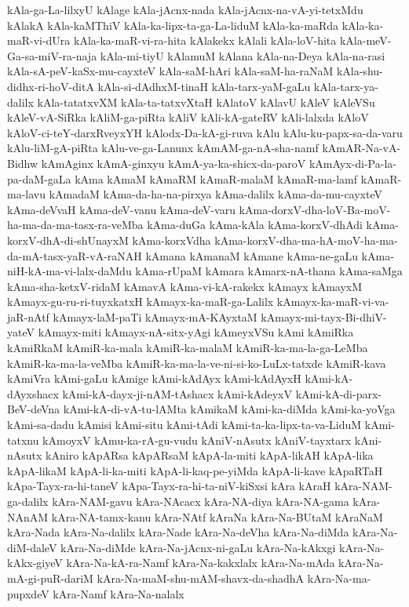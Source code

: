{kAla-ga-La-lilxyU
kAlage
kAla-jAcnx-nada
kAla-jAcnx-na-vA-yi-tetxMdu
kAlakA
kAla-kaMThiV
kAla-ka-lipx-ta-ga-La-liduM
kAla-ka-maRda
kAla-ka-maR-vi-dUra
kAla-ka-maR-vi-ra-hita
kAlakekx
kAlali
kAla-loV-hita
kAla-meV-Ga-sa-miV-ra-naja
kAla-mi-tiyU
kAlamuM
kAlana
kAla-na-Deya
kAla-na-rasi
kAla-sA-peV-kaSx-mu-cayxteV
kAla-saM-hAri
kAla-saM-ha-raNaM
kAla-shu-didhx-ri-hoV-ditA
kAla-si-dAdhxM-tinaH
kAla-tarx-yaM-gaLu
kAla-tarx-ya-dalilx
kAla-tatatxvXM
kAla-ta-tatxvXtaH
kAlatoV
kAlavU
kAleV
kAleVSu
kAleV-vA-SiRka
kAliM-ga-piRta
kAliV
kAli-kA-gateRV
kAli-lalxda
kAloV
kAloV-ci-teY-darxRveyxYH
kAlodx-Da-kA-gi-ruva
kAlu
kAlu-ku-papx-sa-da-varu
kAlu-liM-gA-piRta
kAlu-ve-ga-Lanunx
kAmAM-ga-nA-sha-namf
kAmAR-Na-vA-Bidhw
kAmAginx
kAmA-ginxyu
kAmA-ya-ka-shicx-da-paroV
kAmAyx-di-Pa-la-pa-daM-gaLa
kAma
kAmaM
kAmaRM
kAmaR-malaM
kAmaR-ma-lamf
kAmaR-ma-lavu
kAmadaM
kAma-da-ha-na-pirxya
kAma-dalilx
kAma-da-mu-cayxteV
kAma-deVvaH
kAma-deV-vanu
kAma-deV-varu
kAma-dorxV-dha-loV-Ba-moV-ha-ma-da-ma-tasx-ra-veMba
kAma-duGa
kAma-kAla
kAma-korxV-dhAdi
kAma-korxV-dhA-di-shUnayxM
kAma-korxVdha
kAma-korxV-dha-ma-hA-moV-ha-ma-da-mA-tasx-yaR-vA-raNAH
kAmana
kAmanaM
kAmane
kAma-ne-gaLu
kAma-niH-kA-ma-vi-lalx-daMdu
kAma-rUpaM
kAmara
kAmarx-nA-thana
kAma-saMga
kAma-sha-ketxV-ridaM
kAmavA
kAma-vi-kA-rakekx
kAmayx
kAmayxM
kAmayx-gu-ru-ri-tuyxkatxH
kAmayx-ka-maR-ga-Lalilx
kAmayx-ka-maR-vi-va-jaR-nAtf
kAmayx-laM-paTi
kAmayx-mA-KAyxtaM
kAmayx-mi-tayx-Bi-dhiV-yateV
kAmayx-miti
kAmayx-nA-sitx-yAgi
kAmeyxVSu
kAmi
kAmiRka
kAmiRkaM
kAmiR-ka-mala
kAmiR-ka-malaM
kAmiR-ka-ma-la-ga-LeMba
kAmiR-ka-ma-la-veMba
kAmiR-ka-ma-la-ve-ni-si-ko-LuLx-tatxde
kAmiR-kava
kAmiVra
kAmi-gaLu
kAmige
kAmi-kAdAyx
kAmi-kAdAyxH
kAmi-kA-dAyxshacx
kAmi-kA-dayx-ji-nAM-tAshacx
kAmi-kAdeyxV
kAmi-kA-di-parx-BeV-deVna
kAmi-kA-di-vA-tu-lAMta
kAmikaM
kAmi-ka-diMda
kAmi-ka-yoVga
kAmi-sa-dadu
kAmisi
kAmi-situ
kAmi-tAdi
kAmi-ta-ka-lipx-ta-va-LiduM
kAmi-tatxnu
kAmoyxV
kAmu-ka-rA-gu-vudu
kAniV-nAsutx
kAniV-tayxtarx
kAni-nAsutx
kAniro
kApARsa
kApARsaM
kApA-la-miti
kApA-likAH
kApA-lika
kApA-likaM
kApA-li-ka-miti
kApA-li-kaq-pe-yiMda
kApA-li-kave
kApaRTaH
kApa-Tayx-ra-hi-taneV
kApa-Tayx-ra-hi-ta-niV-kiSxsi
kAra
kAraH
kAra-NAM-ga-dalilx
kAra-NAM-gavu
kAra-NAcacx
kAra-NA-diya
kAra-NA-gama
kAra-NAnAM
kAra-NA-tamx-kanu
kAra-NAtf
kAraNa
kAra-Na-BUtaM
kAraNaM
kAra-Nada
kAra-Na-dalilx
kAra-Nade
kAra-Na-deVha
kAra-Na-diMda
kAra-Na-diM-daleV
kAra-Na-diMde
kAra-Na-jAcnx-ni-gaLu
kAra-Na-kAkxgi
kAra-Na-kAkx-giyeV
kAra-Na-kA-ra-Namf
kAra-Na-kakxlalx
kAra-Na-mAda
kAra-Na-mA-gi-puR-dariM
kAra-Na-maM-shu-mAM-shavx-da-shadhA
kAra-Na-ma-pupxdeV
kAra-Namf
kAra-Na-nalalx
}
